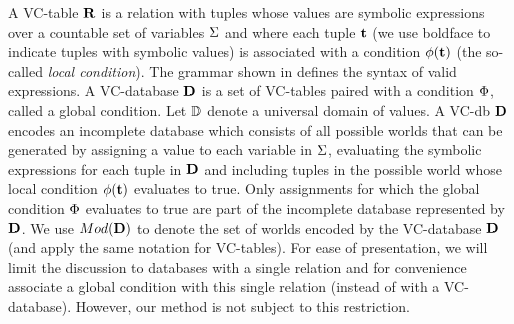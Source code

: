 A VC-table $\mathbf{R}$ is a relation with tuples whose values are symbolic expressions over a countable set of variables $\Sigma$ and where each tuple $\mathbf{t}$ (we use boldface to indicate tuples with symbolic values) is associated with a condition $\phi(\mathbf{t})$ (the so-called \textit{local condition}). The grammar shown in  defines the syntax of valid expressions. A VC-database $\mathbf{D}$ is a set of VC-tables paired with a condition $\Phi$, called a global condition. Let $\mathbb{D}$ denote a universal domain of values.
A VC-db $\mathbf{D}$ encodes an incomplete database which consists of all possible worlds that can be generated by assigning a value to each variable in $\Sigma$, evaluating the symbolic expressions for each tuple in $\mathbf{D}$ and including tuples in the possible world whose local condition $\phi(\mathbf{t})$ evaluates to true. Only assignments for which the global condition $\Phi$ evaluates to true are part of the incomplete database represented by $\mathbf{D}$.
We use $Mod({\mathbf{D}})$ to denote the set of worlds encoded by the VC-database $\mathbf{D}$ (and apply the same notation for VC-tables). For ease of presentation, we will limit the discussion to databases with a single relation and for convenience associate a global condition with this single relation (instead of with a VC-database). However, our method is not subject to this restriction.

